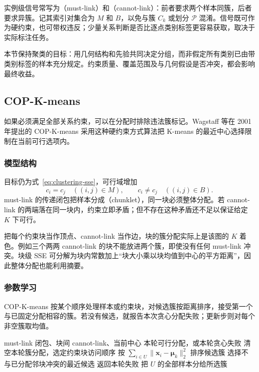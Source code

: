 实例级信号常写为（must-link）和（cannot-link）：前者要求两个样本同簇，后者要求异簇。记其索引对集合为 $M$ 和 $B$，以免与簇 $C_k$ 或划分 $\mathcal{P}$ 混淆。信号既可作为硬约束，也可带权违反；少量关系判断是否比逐点类别标签更容易获取，取决于实际标注任务。

本节保持聚类的目标：用几何结构和先验共同决定分组，而非假定所有类别已由带类别标签的样本充分规定。约束质量、覆盖范围及与几何假设是否冲突，都会影响最终收益。

\subsection{COP-K-means}
\label{sec:clustering-cop}

如果必须满足全部关系约束，可以在分配时排除违法簇标记。Wagstaff 等在 2001 年提出的 COP-K-means 采用这种硬约束方式算法把 K-means 的最近中心选择限制在当前可行选项内。

\subsubsection{模型结构}

目标仍为式~\eqref{eq:clustering-sse}，可行域增加
\begin{equation}
 c_i=c_j\quad((i,j)\in M),\qquad
 c_i\ne c_j\quad((i,j)\in B).
 \label{eq:clustering-cop}
\end{equation}
must-link 的传递闭包把样本分成（chunklet），同一块必须整体分配。若 cannot-link 的两端落在同一块内，约束立即矛盾；但不存在这种矛盾还不足以保证给定 $K$ 下可行。

把每个约束块当作顶点、cannot-link 当作边，块的簇分配实际上是该图的 $K$ 着色。例如三个两两 cannot-link 的块不能放进两个簇，即使没有任何 must-link 冲突。块级 SSE 可分解为块内常数加上“块大小乘以块均值到中心的平方距离”，因此整体分配也能利用摘要。

\subsubsection{参数学习}

COP-K-means 按某个顺序处理样本或约束块，对候选簇按距离排序，接受第一个与已固定分配相容的簇。若没有候选，就报告本次贪心分配失败；更新步则对每个非空簇取均值。

\begin{algorithm}
 \label{alg:clustering-cop}
 \begin{algorithmic}[1]
 \Require must-link 闭包、块间 cannot-link、当前中心
 \Ensure 本轮可行分配，或本轮贪心失败
 \State 清空本轮簇分配，选定约束块访问顺序
  \State 按 $\sum_{i\in U}\lVert\bm{x}_i-\bm{\mu}_k\rVert_2^2$ 排序候选簇
  \State 选择不与已分配邻块冲突的最近候选
   \State 返回本轮失败
  \EndIf
  \State 把 $U$ 的全部样本分给所选簇
 \EndFor
 \end{algorithmic}
\end{algorithm}

